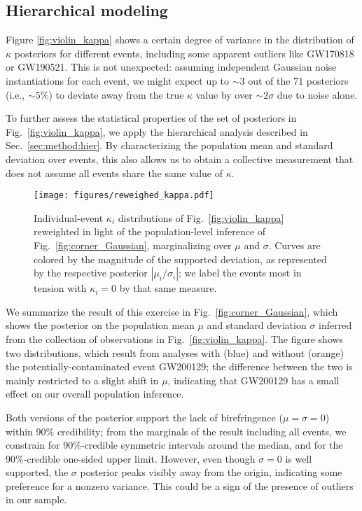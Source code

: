 \documentclass[aps,prd,twocolumn,superscriptaddress,preprintnumbers,nofootinbib]{revtex4-2}
\begin{document}
\subsection{Hierarchical modeling}
\label{sec:results:hier}

Figure \ref{fig:violin_kappa} shows a certain degree of variance in the distribution of $\kappa$ posteriors for different events, including some apparent outliers like GW170818 or GW190521.
This is not unexpected: assuming independent Gaussian noise instantiations for each event, we might expect up to ${\sim}3$ out of the 71 posteriors (i.e., ${\sim}5\%$) to deviate away from the true $\kappa$ value by over ${\sim}2\sigma$ due to noise alone.

To further assess the statistical properties of the set of posteriors in Fig.~\ref{fig:violin_kappa}, we apply the hierarchical analysis described in Sec.~\ref{sec:method:hier}.
By characterizing the population mean and standard deviation over events, this also allows us to obtain a collective measurement that does not assume all events share the same value of $\kappa$.

\begin{figure}
    \texttt{[image: figures/reweighed\_kappa.pdf]}
    \caption{
        Individual-event $\kappa_i$ distributions of Fig.~\ref{fig:violin_kappa} reweighted in light of the population-level inference of Fig.~\ref{fig:corner_Gaussian}, marginalizing over $\mu$ and $\sigma$.
        Curves are colored by the magnitude of the supported deviation, as represented by the respective posterior $|\mu_i / \sigma_i|$; we label the events most in tension with $\kappa_i = 0$ by that same measure.
    }
    \label{fig:reweighted_kappa}
\end{figure}

We summarize the result of this exercise in Fig.~\ref{fig:corner_Gaussian}, which shows the posterior on the population mean $\mu$ and standard deviation $\sigma$ inferred from the collection of observations in Fig.~\ref{fig:violin_kappa}.
The figure shows two distributions, which result from analyses with (blue) and without (orange) the potentially-contaminated event GW200129; the difference between the two is mainly restricted to a slight shift in $\mu$, indicating that GW200129 has a small effect on our overall population inference.

Both versions of the posterior support the lack of birefringence ($\mu = \sigma = 0$) within 90\% credibility; from the marginals of the result including all events, we constrain for 90\%-credible symmetric intervals around the median, and for the 90\%-credible one-sided upper limit.
However, even though $\sigma = 0$ is well supported, the $\sigma$ posterior peaks visibly away from the origin, indicating some preference for a nonzero variance.
This could be a sign of the presence of outliers in our sample.
\end{document}
